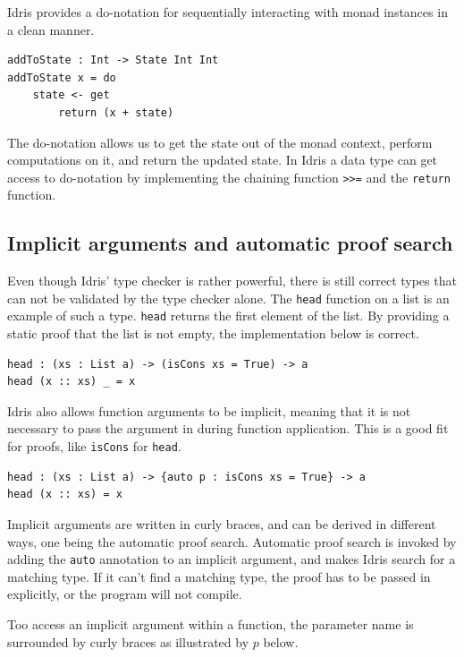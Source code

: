 \documentclass[12pt]{article}
\begin{document}
Idris provides a do-notation for sequentially interacting with monad instances in a clean manner.

\begin{lstlisting}
addToState : Int -> State Int Int
addToState x = do
   	state <- get
        return (x + state)
\end{lstlisting}

The do-notation allows us to get the state out of the monad context, perform computations on it, and return the updated state.
In Idris a data type can get access to do-notation by implementing the chaining function \lstinline{>>=} and the \lstinline{return} function.

\subsection{Implicit arguments and automatic proof search}

Even though Idris' type checker is rather powerful, there is still correct types that can not be validated by the type checker alone.
The \lstinline{head} function on a list is an example of such a type.
\lstinline{head} returns the first element of the list.
By providing a static proof that the list is not empty, the implementation below is correct.

\begin{lstlisting}
head : (xs : List a) -> (isCons xs = True) -> a
head (x :: xs) _ = x
\end{lstlisting}

Idris also allows function arguments to be implicit, meaning that it is not necessary to pass the argument in during function application.
This is a good fit for proofs, like \lstinline{isCons} for \lstinline{head}.

\begin{lstlisting}
head : (xs : List a) -> {auto p : isCons xs = True} -> a
head (x :: xs) = x
\end{lstlisting}

Implicit arguments are written in curly braces, and can be derived in different ways, one being the automatic proof search.
Automatic proof search is invoked by adding the \lstinline{auto} annotation to an implicit argument, and makes Idris search for a matching type.
If it can't find a matching type, the proof has to be passed in explicitly, or the program will not compile.

Too access an implicit argument within a function, the parameter name is surrounded by curly braces as illustrated by $p$ below.
\end{document}
